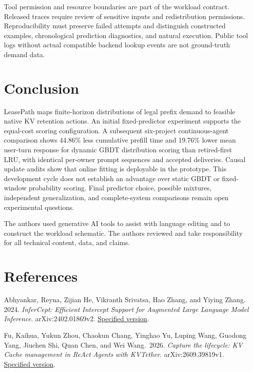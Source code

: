 \documentclass[sigconf, screen, review]{acmart}
\begin{document}
Tool permission and resource boundaries are part of the workload
contract. Released traces require review of sensitive inputs and
redistribution permissions. Reproducibility must preserve failed
attempts and distinguish constructed examples, chronological prediction
diagnostics, and natural execution. Public tool logs without actual
compatible backend lookup events are not ground-truth demand data.

\section{Conclusion}\label{conclusion}

LeasePath maps finite-horizon distributions of legal prefix demand to
feasible native KV retention actions. An initial fixed-predictor
experiment supports the equal-cost scoring configuration. A subsequent
six-project continuous-agent comparison shows 44.86\% less cumulative
prefill time and 19.76\% lower mean user-turn response for dynamic GBDT
distribution scoring than retired-first LRU, with identical per-owner
prompt sequences and accepted deliveries. Causal update audits show
that online fitting is deployable in the prototype. This development
cycle does not establish an advantage over static GBDT or fixed-window
probability scoring. Final predictor choice, possible mixtures,
independent generalization, and complete-system comparisons remain
open experimental questions.

\begin{acks}
The authors used generative AI tools to assist with language editing and to construct the workload schematic. The authors reviewed and take responsibility for all technical content, data, and claims.
\end{acks}

\section*{References}\label{references}
\small

Abhyankar, Reyna, Zijian He, Vikranth Srivatsa, Hao Zhang, and Yiying
Zhang. 2024. \emph{InferCept: Efficient Intercept Support for Augmented
Large Language Model Inference}. arXiv:2402.01869v2.
\href{https://arxiv.org/abs/2402.01869v2}{Specified version}.

Fu, Kaihua, Yukun Zhou, Chaokun Chang, Yinghao Yu, Luping Wang, Guodong Yang, Jiuchen Shi, Quan Chen, and Wei Wang.~2026. \emph{Capture the lifecycle: KV Cache
management in ReAct Agents with KVTether}. arXiv:2609.39819v1.
\href{https://arxiv.org/abs/2609.39819v1}{Specified version}.
\end{document}
